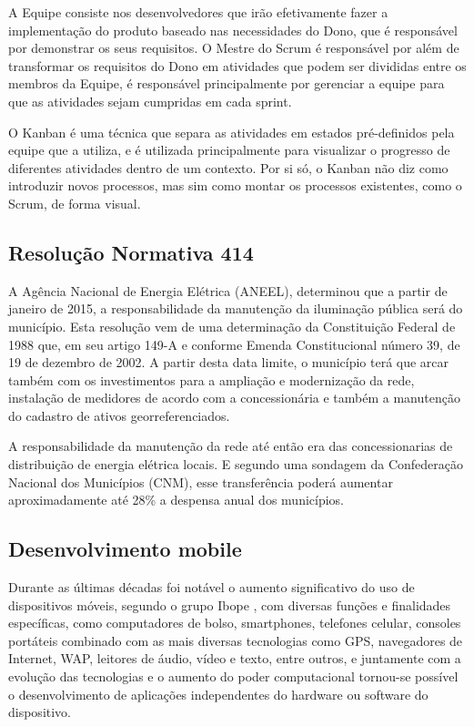 \documentclass[
	article,			%
	11pt,				%
	oneside,			%
	a4paper,			%
	english,			%
	brazil,				%
	sumario=tradicional
	]{abntex2}
\begin{document}
A Equipe consiste nos desenvolvedores que irão efetivamente fazer a implementação do produto baseado nas necessidades do Dono, que é responsável por demonstrar os seus requisitos.
O Mestre do Scrum é responsável por além de transformar os requisitos do Dono em atividades que podem ser divididas entre os membros da Equipe, é responsável principalmente por gerenciar a equipe para que as atividades sejam cumpridas em cada sprint. \cite{scrum}

O Kanban é uma técnica que separa as atividades em estados pré-definidos pela equipe que a utiliza, e é utilizada principalmente para visualizar o progresso de diferentes atividades dentro de um contexto.
Por si só, o Kanban não diz como introduzir novos processos, mas sim como montar os processos existentes, como o Scrum, de forma visual.

\subsection{Resolução Normativa 414}

A Agência Nacional de Energia Elétrica (ANEEL), determinou que a partir de janeiro de 2015, a responsabilidade da manutenção da iluminação pública será do município.
Esta resolução vem de uma determinação da Constituição Federal de 1988 que, em seu artigo 149-A e conforme Emenda Constitucional número 39, de 19 de dezembro de 2002.
A partir desta data limite, o município terá que arcar também com os investimentos para a ampliação e modernização da rede, instalação de medidores de acordo com a concessionária e também a manutenção do cadastro de ativos georreferenciados.

A responsabilidade da manutenção da rede até então era das concessionarias de distribuição de energia elétrica locais.
E segundo uma sondagem da Confederação Nacional dos Municípios (CNM), esse transferência poderá aumentar aproximadamente até 28\% a despensa anual dos municípios.\cite{cdu}

\subsection{Desenvolvimento mobile}

Durante as últimas décadas foi notável o aumento significativo do uso de dispositivos móveis, segundo o grupo Ibope \cite{ibope}, com diversas funções e finalidades específicas, como computadores de bolso, smartphones, telefones celular, consoles portáteis combinado com as mais diversas tecnologias como GPS, navegadores de Internet, WAP, leitores de áudio, vídeo e texto, entre outros, e juntamente com a evolução das tecnologias e o aumento do poder computacional tornou-se possível o desenvolvimento de aplicações independentes do hardware ou software do dispositivo.
\end{document}
